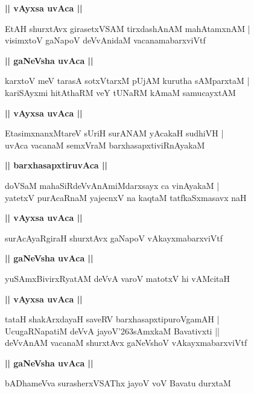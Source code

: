 \documentclass[twoside,12pt,openright]{book}
\def\S{\char'263}
\newcounter{shloka}[chapter]
\def\uvaca#1{\centerline{{\large\textbf{#1}}}}
\begin{document}
\uvaca{|| vAyxsa uvAca ||}

\begin{shloka}%
EtAH shurxtAvx girasetxVSAM tirxdashAnAM mahAtamxnAM |\\
visimxtoV gaNapoV deVvAnidaM vacanamabarxviVtf 
\end{shloka}

\uvaca{|| gaNeVsha uvAca ||}

\begin{shloka}%
karxtoV meV tarasA sotxVtarxM pUjAM kurutha sAMparxtaM |\\
kariSAyxmi hitAthaRM veY tUNaRM kAmaM samucayxtAM 
\end{shloka}

\uvaca{|| vAyxsa uvAca ||}

\begin{shloka}%
EtasimxnanxMtareV sUriH surANAM yAcakaH sudhiVH |\\
uvAca vacanaM semxVraM barxhasapxtiviRnAyakaM 
\end{shloka}

\uvaca{|| barxhasapxtiruvAca ||}

\begin{shloka}%
doVSaM mahaSiRdeVvAnAmiMdarxsayx ca vinAyakaM |\\
yatetxV purAcaRnaM yajecnxV na kaqtaM tatfkaSxmasavx naH 
\end{shloka}

\uvaca{|| vAyxsa uvAca ||}

\begin{shloka}%
surAcAyaRgiraH shurxtAvx gaNapoV vAkayxmabarxviVtf 
\end{shloka}

\uvaca{|| gaNeVsha uvAca ||}

\begin{shloka}%
yuSAmxBivirxRyatAM deVvA varoV matotxV hi vAMcitaH 
\end{shloka}

\uvaca{|| vAyxsa uvAca ||}

\begin{shloka}%
tataH shakArxdayaH saveRV barxhasapxtipuroVgamAH |\\
UcugaRNapatiM deVvA jayoV\S sAmxkaM Bavativxti ||\\
deVvAnAM vacanaM shurxtAvx gaNeVshoV vAkayxmabarxviVtf
\end{shloka}

\uvaca{|| gaNeVsha uvAca ||}

\begin{shloka}%
bADhameVva surasherxVSAThx jayoV voV Bavatu durxtaM 
\end{shloka}
\end{document}
